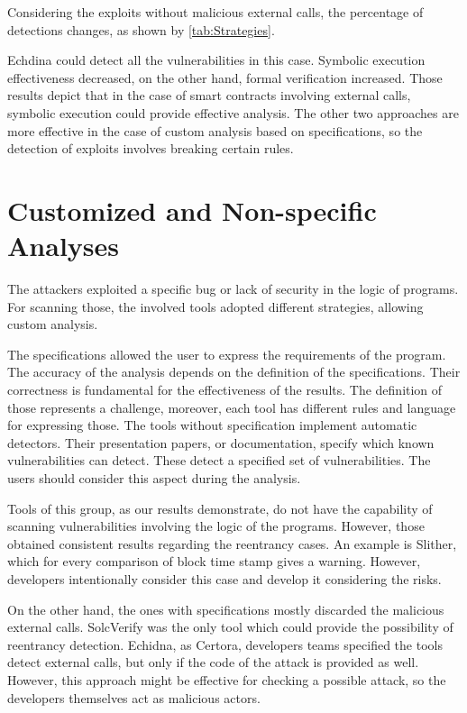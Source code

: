 Considering the exploits without malicious external calls, the percentage of detections changes, as shown by \autoref{tab:Strategies}.

Echdina could detect all the vulnerabilities in this case. 
Symbolic execution effectiveness decreased, on the other hand, formal verification increased. 
Those results depict that in the case of smart contracts involving external calls, symbolic execution could provide effective analysis.
The other two approaches are more effective in the case of custom analysis based on specifications, so the detection of exploits involves breaking certain rules. 


\section{Customized and Non-specific Analyses} 
The attackers exploited a specific bug or lack of security in the logic of programs. For scanning those, the involved tools adopted different strategies, allowing custom analysis. 

The specifications allowed the user to express the requirements of the program. The accuracy of the analysis depends on the definition of the specifications. 
Their correctness is fundamental for the effectiveness of the results. 
The definition of those represents a challenge, moreover, each tool has different rules and language for expressing those.
The tools without specification implement automatic detectors. 
Their presentation papers, or documentation, specify which known vulnerabilities can detect. These detect a specified set of vulnerabilities. 
The users should consider this aspect during the analysis. 

Tools of this group, as our results demonstrate, do not have the capability of scanning vulnerabilities involving the logic of the programs. 
However, those obtained consistent results regarding the reentrancy cases. 
An example is Slither, which for every comparison of block time stamp gives a warning. However, developers intentionally consider this case and develop it considering the risks. 

On the other hand, the ones with specifications mostly discarded the malicious external calls. 
SolcVerify was the only tool which could provide the possibility of reentrancy detection. Echidna, as Certora, developers teams specified the tools detect external calls, but only if the code of the attack is provided as well.
However, this approach might be effective for checking a possible attack, so the developers themselves act as malicious actors.

